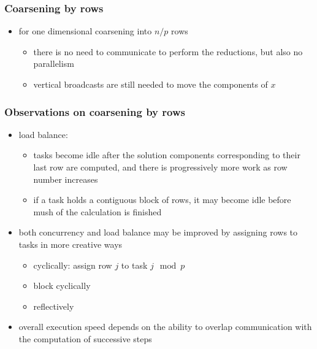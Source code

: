\begin{frame}[fragile]
%
  \frametitle{Coarsening by rows}
%
  \begin{itemize}
%
  \item for one dimensional coarsening into $n/p$ rows
    \begin{itemize}
    \item there is no need to communicate to perform the reductions, but also no parallelism
    \item vertical broadcasts are still needed to move the components of $x$
    \end{itemize}
%
  \begin{center}
    \begin{minipage}{.85\linewidth}
      \begin{algorithm}[H]
%
        \dontprintsemicolon
        \nocaptionofalgo
        \setalcaphskip{0ex}
%
% 
      \end{algorithm}
    \end{minipage}
  \end{center}
%
  \end{itemize}
%
\end{frame}

\begin{frame}[fragile]
%
  \frametitle{Observations on coarsening by rows}
%
  \begin{itemize}
%
  \item load balance:
%
    \begin{itemize}
    \item tasks become idle after the solution components corresponding to their last row are
      computed, and there is progressively more work as row number increases
    \item if a task holds a contiguous block of rows, it may become idle before mush of the
      calculation is finished
    \end{itemize}
%
  \item both concurrency and load balance may be improved by assigning rows to tasks in more
    creative ways
    \begin{itemize}
    \item cyclically: assign row $j$ to task $j \mod p$
    \item block cyclically
    \item reflectively
    \end{itemize}
%
  \item overall execution speed depends on the ability to overlap communication with the
    computation of successive steps
%
  \end{itemize}
%
\end{frame}

